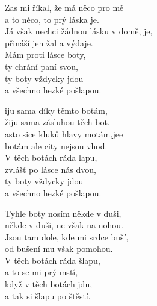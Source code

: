 
\ve
{}Zas mi říkal, že má něco pro mě \\
a to něco, to prý láska je. \\
Já však nechci žádnou lásku v domě, je, \\
přináší jen žal a výdaje. \\
Mám proti lásce boty, \\
ty chrání paní svou, \\
ty boty vždycky jdou \\
a všechno hezké pošlapou. 

\ve
{}iju sama díky těmto botám, \\
žiju sama zásluhou těch bot. \\
asto sice kluků hlavy motám,jee \\
botám ale city nejsou vhod. \\
V těch botách ráda lapu, \\
zvlášť po lásce nás dvou, \\
ty boty vždycky jdou \\
a všechno hezké pošlapou. 

\ve
Tyhle boty nosím někde v duši, \\
někde v duši, ne však na nohou. \\
Jsou tam dole, kde mi srdce buší, \\
od bušení mu však pomohou. \\
V těch botách ráda šlapu, \\
a to se mi prý mstí, \\
když v těch botách jdu, \\
a tak si šlapu po štěstí.



\esong